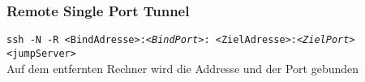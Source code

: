 \begin{frame}
\frametitle{Remote Single Port Tunnel}
\texttt{ssh -N -R <BindAdresse>:\textit{<BindPort>}: <ZielAdresse>:\textit{<ZielPort>} <jumpServer>}\\
Auf dem entfernten Rechner wird die Addresse und der Port gebunden
\end{frame}